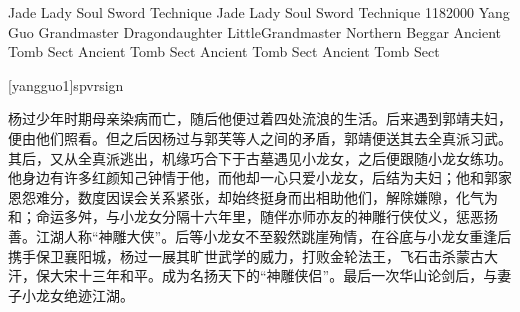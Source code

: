 \documentclass[doctor, vlined, ]{DissertUESTC}
\begin{document}
	\uestczhtitlepage[compress]  %

	
	\uestcentitlepage{}{}{}{}{}{}{}  %
					{Jade Lady Soul Sword Technique Jade Lady Soul Sword Technique}
					{1182000}
					{Yang Guo}
					{Grandmaster Dragondaughter Little}{Grandmaster Northern Beggar}
					{Ancient Tomb Sect Ancient Tomb Sect Ancient Tomb Sect Ancient Tomb Sect}  %
	

	\declaration{}{}{}  %
	[yangguo1]{spvrsign}  %

	
	\zhabstract
	
	杨过少年时期母亲染病而亡，随后他便过着四处流浪的生活。后来遇到郭靖夫妇，便由他们照看。但之后因杨过与郭芙等人之间的矛盾，郭靖便送其去全真派习武。其后，又从全真派逃出，机缘巧合下于古墓遇见小龙女，之后便跟随小龙女练功。他身边有许多红颜知己钟情于他，而他却一心只爱小龙女，后结为夫妇；他和郭家恩怨难分，数度因误会关系紧张，却始终挺身而出相助他们，解除嫌隙，化气为和；命运多舛，与小龙女分隔十六年里，随伴亦师亦友的神雕行侠仗义，惩恶扬善。江湖人称“神雕大侠”。后等小龙女不至毅然跳崖殉情，在谷底与小龙女重逢后携手保卫襄阳城，杨过一展其旷世武学的威力，打败金轮法王，飞石击杀蒙古大汗，保大宋十三年和平。成为名扬天下的“神雕侠侣”。最后一次华山论剑后，与妻子小龙女绝迹江湖。


\end{document}
